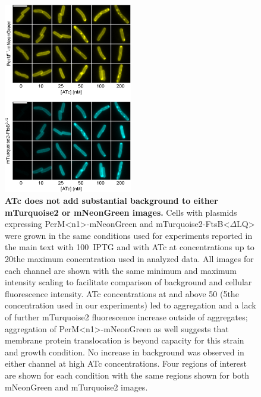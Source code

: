 \documentclass[pdflatex,sn-nature]{sn-jnl}%
\def\textsuperscript#1{<#1>}%
\newcommand\ftsbdLQ{FtsB\textsuperscript{$\Delta{}$LQ}}
\newcommand\permN{PerM\textsuperscript{n1}}
\begin{document}
\begin{appendices}
\begin{figure}[htb]
\centering
\includegraphics[width=0.5\textwidth]{./figS3.eps}
\caption{\textbf{ATc does not add substantial background to either mTurquoise2 or mNeonGreen images.}
Cells with plasmids expressing \permN{}-mNeonGreen and mTurquoise2-\ftsbdLQ{} were grown in the same conditions used for experiments reported in the main text with \qty{100}{\uM}~IPTG and with ATc at concentrations up to 20\texttimes the maximum concentration used in analyzed data.
All images for each channel are shown with the same minimum and maximum intensity scaling to facilitate comparison of background and cellular fluorescence intensity.
ATc concentrations at and above \qty{50}{\nM} (5\texttimes the concentration used in our experiments) led to aggregation and a lack of further mTurquoise2 fluorescence increase outside of aggregates; aggregation of \permN{}-mNeonGreen as well suggests that membrane protein translocation is beyond capacity for this strain and growth condition.
No increase in background was observed in either channel at high ATc concentrations.
Four regions of interest are shown for each condition with the same regions shown for both mNeonGreen and mTurquoise2 images.
}\label{figS3}
\end{figure}


\end{appendices}
\end{document}
